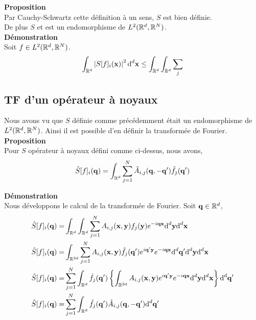 \documentclass[10pt]{article}
\begin{document}
\textbf{Proposition}\\
Par Cauchy-Schwartz cette définition à un sens, $S$ est bien définie. \\
De plus $S$ et est un endomorphisme de $L^2(\mathbb{R}^d, \mathbb{R}^N)$. \\

\textbf{Démonstration}\\
Soit $f\in L^2(\mathbb{R}^d, \mathbb{R}^N)$.\\

\begin{equation}
   \int_{\mathbb{R}^d} \left| S[f]_i ({\bf x}) \right|^{2} \text{d}^d {\bf x} \le \int_{\mathbb{R}^d} \int_{\mathbb{R}^d} \sum_j 
\end{equation}


\vspace*{11pt}

\subsection{TF d'un opérateur à noyaux}

Nous avons vu que $S$ définie comme précédemment était un endomorphisme de $L^2(\mathbb{R}^d, \mathbb{R}^N)$. Ainsi il est possible d'en définir la transformée de Fourier. \\

\textbf{Proposition}\\
Pour $S$ opérateur à noyaux défini comme ci-dessus, nous avons,
\begin{equation}
  \hat{S}[f]_i({\bf q}) = \int_{\mathbb{R}^d} \sum_{j=1}^{N} \hat{A}_{i,j}({\bf q}, -{\bf q}') \hat{f}_j({\bf q}')
\end{equation}



\textbf{Démonstration}\\
Nous développons le calcul de la transformée de Fourier. Soit ${\bf q} \in \mathbb{R}^d$,
\begin{align}
 \hat{S}[f]_i({\bf q})  = & \int_{\mathbb{R}^d} \int_{\mathbb{R}^d} \sum_{j=1}^{N} A_{i,j}({\bf x},{\bf y})f_j({\bf y}) e^{-i{\bf q}{\bf x}} \text{d}^d {\bf y} \text{d}^d {\bf x} \\
 \hat{S}[f]_i({\bf q})  = & \int_{\mathbb{R}^{3d}} \sum_{j=1}^{N} A_{i,j}({\bf x},{\bf y}) \hat{f}_j({\bf q}') e^{i{\bf q}'{\bf y}} e^{- i{\bf q}{\bf x}}  \text{d}^d {\bf q}' \text{d}^d {\bf y} \text{d}^d {\bf x} \\
 \hat{S}[f]_i({\bf q})  = &    \sum_{j=1}^{N} \int_{\mathbb{R}^d} \hat{f}_j({\bf q}') \left\{ \int_{\mathbb{R}^{2d}} A_{i,j}({\bf x},{\bf y})  e^{i{\bf q}'{\bf y}} e^{- i{\bf q}{\bf x}}  \text{d}^d {\bf y} \text{d}^d {\bf x}   \right\} \text{d}^d {\bf q}'\\
\hat{S}[f]_i({\bf q})  = &    \sum_{j=1}^{N} \int_{\mathbb{R}^d} \hat{f}_j({\bf q}') \hat{A}_{i,j}({\bf q}, -{\bf q}') \text{d}^d {\bf q}'\\
\end{align}
\end{document}
